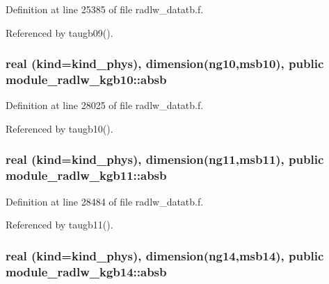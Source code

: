 Definition at line 25385 of file radlw\+\_\+datatb.\+f.



Referenced by taugb09().

\subsubsection[{\texorpdfstring{absb}{absb}}]{\setlength{\rightskip}{0pt plus 5cm}real (kind=kind\+\_\+phys), dimension(ng10,msb10), public module\+\_\+radlw\+\_\+kgb10\+::absb}\hypertarget{group__module__radlw__main_gaf1e2252355a3002080be21ce37d45c3a}{}\label{group__module__radlw__main_gaf1e2252355a3002080be21ce37d45c3a}


Definition at line 28025 of file radlw\+\_\+datatb.\+f.



Referenced by taugb10().

\subsubsection[{\texorpdfstring{absb}{absb}}]{\setlength{\rightskip}{0pt plus 5cm}real (kind=kind\+\_\+phys), dimension(ng11,msb11), public module\+\_\+radlw\+\_\+kgb11\+::absb}\hypertarget{group__module__radlw__main_gacf37465675961812e07616e42b137d70}{}\label{group__module__radlw__main_gacf37465675961812e07616e42b137d70}


Definition at line 28484 of file radlw\+\_\+datatb.\+f.



Referenced by taugb11().

\subsubsection[{\texorpdfstring{absb}{absb}}]{\setlength{\rightskip}{0pt plus 5cm}real (kind=kind\+\_\+phys), dimension(ng14,msb14), public module\+\_\+radlw\+\_\+kgb14\+::absb}\hypertarget{group__module__radlw__main_gaa7a122319c49f3c1e8d51d21771cb63d}{}\label{group__module__radlw__main_gaa7a122319c49f3c1e8d51d21771cb63d}


